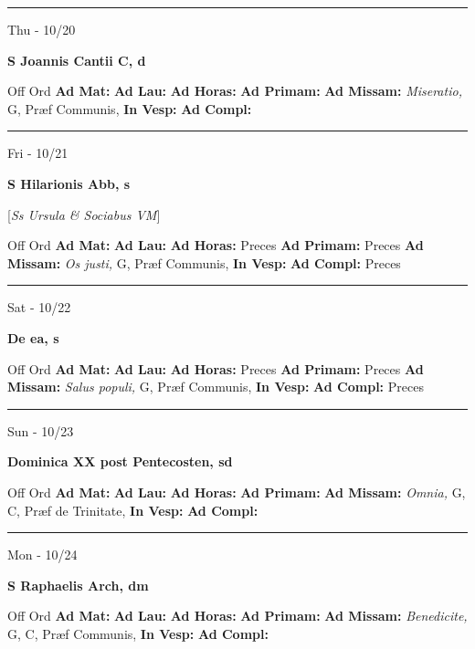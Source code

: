 \documentclass[letterpaper, 10pt]{article}
\begin{document}
\hrule
\begin{center}
Thu - 10/20
\end{center}\textbf{ \large S Joannis Cantii C, \textnormal{\normalsize d}}
\begin{justify}
Off Ord
\textbf{Ad Mat: }
\textbf{Ad Lau: }
\textbf{Ad Horas: }
\textbf{Ad Primam: }
\textbf{Ad Missam:} \textit{Miseratio, } G, Præf Communis, 
\textbf{In Vesp: }
\textbf{Ad Compl: }\end{justify}



\hrule
\begin{center}
Fri - 10/21
\end{center}\textbf{ \large S Hilarionis Abb, \textnormal{\normalsize s}}

[\textit{Ss Ursula \& Sociabus VM}]
\begin{justify}
Off Ord
\textbf{Ad Mat: }
\textbf{Ad Lau: }
\textbf{Ad Horas: }Preces
\textbf{Ad Primam: }Preces
\textbf{Ad Missam:} \textit{Os justi, } G, Præf Communis, 
\textbf{In Vesp: }
\textbf{Ad Compl: }Preces\end{justify}



\hrule
\begin{center}
Sat - 10/22
\end{center}\textbf{ \large De ea, \textnormal{\normalsize s}}
\begin{justify}
Off Ord
\textbf{Ad Mat: }
\textbf{Ad Lau: }
\textbf{Ad Horas: }Preces
\textbf{Ad Primam: }Preces
\textbf{Ad Missam:} \textit{Salus populi, } G, Præf Communis, 
\textbf{In Vesp: }
\textbf{Ad Compl: }Preces\end{justify}



\hrule
\begin{center}
Sun - 10/23
\end{center}\textbf{ \large Dominica XX post Pentecosten, \textnormal{\normalsize sd}}
\begin{justify}
Off Ord
\textbf{Ad Mat: }
\textbf{Ad Lau: }
\textbf{Ad Horas: }
\textbf{Ad Primam: }
\textbf{Ad Missam:} \textit{Omnia, } G, C, Præf de Trinitate, 
\textbf{In Vesp: }
\textbf{Ad Compl: }\end{justify}



\hrule
\begin{center}
Mon - 10/24
\end{center}\textbf{ \large S Raphaelis Arch, \textnormal{\normalsize dm}}
\begin{justify}
Off Ord
\textbf{Ad Mat: }
\textbf{Ad Lau: }
\textbf{Ad Horas: }
\textbf{Ad Primam: }
\textbf{Ad Missam:} \textit{Benedicite, } G, C, Præf Communis, 
\textbf{In Vesp: }
\textbf{Ad Compl: }\end{justify}
\end{document}
